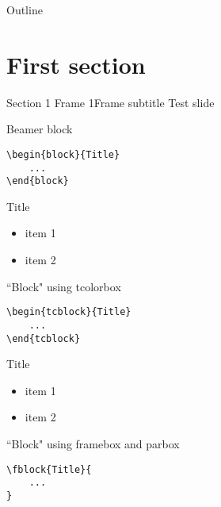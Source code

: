 \begin{frame}
	\titlepage
\end{frame}


\begin{frame}{Outline}
	\tableofcontents[subsectionstyle=hide]
\end{frame}


\section{First section}


\begin{frame}{Section 1 Frame 1}{Frame subtitle}
    Test slide
\end{frame}


\begin{frame}[fragile]{Beamer block}
	\begin{verbatim}
\begin{block}{Title}
    ...
\end{block}
    \end{verbatim}

    \begin{block}{Title}
        \begin{itemize}
            \item item 1
            \item item 2
        \end{itemize}
    \end{block}
\end{frame}


\begin{frame}[fragile]{``Block" using tcolorbox}
	\begin{verbatim}
\begin{tcblock}{Title}
    ...
\end{tcblock}
    \end{verbatim}

    \begin{tcblock}{Title}
        \begin{itemize}
            \item item 1
            \item item 2
        \end{itemize}
    \end{tcblock}
\end{frame}


\begin{frame}[fragile]{``Block" using framebox and parbox}
    \begin{verbatim}
\fblock{Title}{
    ...
}
    \end{verbatim}
	
\end{frame}


